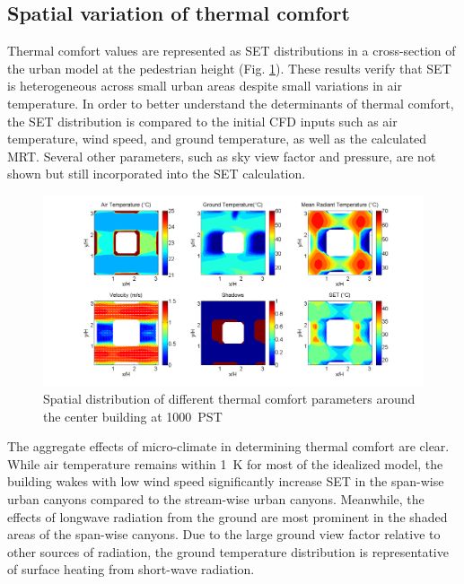 \documentclass[preprint,3p,12pt,english]{elsarticle}
\begin{document}
\subsection{Spatial variation of thermal comfort}

Thermal comfort values are represented as SET distributions in a cross-section of the urban model at the pedestrian height (Fig.  \ref{Fig.Parameters}). These results verify that SET is heterogeneous across small urban areas despite small variations in air temperature. In order to better understand the determinants of thermal comfort, the SET distribution is compared to the initial CFD inputs such as air temperature, wind speed, and ground temperature, as well as the calculated MRT. Several other parameters, such as sky view factor and pressure, are not shown but still incorporated into the SET calculation.  

\begin{figure}[H] \centering  
\graphicspath{ {image/} }
\includegraphics[width=14cm]{1000PST_flux.png}
\hskip 0.5in
\caption{Spatial distribution of different thermal comfort parameters around the center building at 1000~PST} 
\label{Fig.Parameters}
\end{figure}

The aggregate effects of micro-climate in determining thermal comfort are clear. While air temperature remains within 1~K for most of the idealized model, the building wakes with low wind speed significantly increase SET in the span-wise urban canyons compared to the stream-wise urban canyons.  Meanwhile, the effects of longwave radiation from the ground are most prominent in the shaded areas of the span-wise canyons. Due to the large ground view factor relative to other sources of radiation, the ground temperature distribution is representative of surface heating from short-wave radiation. 
\end{document}
